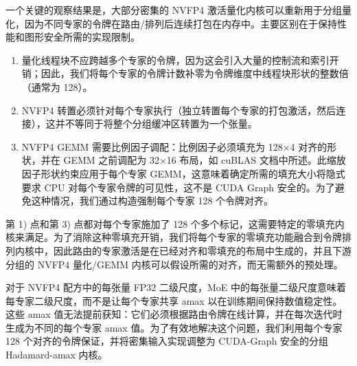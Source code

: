 一个关键的观察结果是，大部分密集的 NVFP4 激活量化内核可以重新用于分组量化，因为不同专家的令牌在路由/排列后连续打包在内存中。主要区别在于保持性能和图形安全所需的实现限制。 

\begin{enumerate}

\item 量化线程块不应跨越多个专家的令牌，因为这会引入大量的控制流和索引开销；因此，我们将每个专家的令牌计数补零为令牌维度中线程块形状的整数倍（通常为 128）。 

\item NVFP4 转置必须针对每个专家执行（独立转置每个专家的打包激活，然后连接），这并不等同于将整个分组缓冲区转置为一个张量。 

\item NVFP4 GEMM 需要比例因子调配：比例因子必须填充为 128×4 对齐的形状，并在 GEMM 之前调配为 32×16 布局，如 cuBLAS 文档中所述\cite{cublas_sf_layout}。此缩放因子形状约束应用于每个专家 GEMM，这意味着确定所需的填充大小将隐式要求 CPU 对每个专家令牌的可见性，这不是 CUDA Graph 安全的。为了避免这种情况，我们通过构造强制每个专家 128 个令牌对齐。
\end{enumerate}

第 1) 点和第 3) 点都对每个专家施加了 128 个多个标记，这需要特定的零填充内核来满足。为了消除这种零填充开销，我们将每个专家的零填充功能融合到令牌排列内核中，因此路由的专家激活是在已经对齐和零填充的布局中生成的，并且下游分组的 NVFP4 量化/GEMM 内核可以假设所需的对齐，而无需额外的预处理。

对于 NVFP4 配方中的每张量 FP32 二级尺度，MoE 中的每张量二级尺度意味着每专家二级尺度，而不是让每个专家共享 amax 以在训练期间保持数值稳定性。这些 amax 值无法提前获知：它们必须根据路由令牌在线计算，并在每次迭代时生成为不同的每个专家 amax 值。为了有效地解决这个问题，我们利用每个专家 128 个对齐的令牌保证，并将密集输入实现调整为 CUDA-Graph 安全的分组 Hadamard-amax 内核。 


